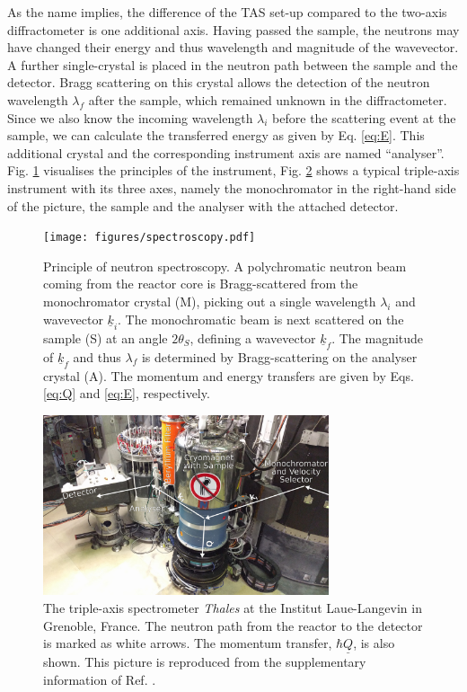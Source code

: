 As the name implies, the difference of the TAS set-up compared to the two-axis diffractometer is one additional axis.
Having passed the sample, the neutrons may have changed their energy and thus wavelength and magnitude of the wavevector.
A further single-crystal is placed in the neutron path between the sample and the detector. Bragg scattering on this crystal
allows the detection of the neutron wavelength $\lambda_f$ after the sample, which remained unknown in the diffractometer.
Since we also know the incoming wavelength $\lambda_i$ before the scattering event at the sample, we can calculate the
transferred energy as given by Eq. \ref{eq:E}. This additional crystal and the corresponding instrument axis are named ``analyser''.
Fig. \ref{fig:spectroscopy} visualises the principles of the instrument, Fig. \ref{fig:thales} shows a typical triple-axis
instrument with its three axes, namely the monochromator in the right-hand side of the picture, the sample and the analyser
with the attached detector.

\begin{figure}[htb]
	\centering
	\texttt{[image: figures/spectroscopy.pdf]}
	\caption[Neutron spectroscopy.]{
		Principle of neutron spectroscopy. A polychromatic neutron beam coming from the reactor core is Bragg-scattered
		from the monochromator crystal (M), picking out a single wavelength $\lambda_i$ and wavevector $\underline{k}_i$.
		The monochromatic beam is next scattered on the sample (S) at an angle $2\theta_S$, defining a wavevector $\underline{k}_f$.
		The magnitude of $\underline{k}_f$ and thus $\lambda_f$ is determined by Bragg-scattering on the analyser crystal (A).
		The momentum and energy transfers are given by Eqs. \ref{eq:Q} and \ref{eq:E}, respectively. }
	\label{fig:spectroscopy}
\end{figure}

\begin{figure}[htb]
	\centering
	\includegraphics[width=0.75\textwidth]{figures/thales.jpg}
	\caption[The Thales instrument at the ILL.]{
		The triple-axis spectrometer \textit{Thales} \cite{thales} at the Institut Laue-Langevin in Grenoble, France.
		The neutron path from the reactor to the detector is marked as white arrows. The momentum transfer, 
		$\hbar \underline{Q}$, is also shown.
		This picture is reproduced from the supplementary information of Ref. \cite{skxpaper}.}
	\label{fig:thales}
\end{figure}



